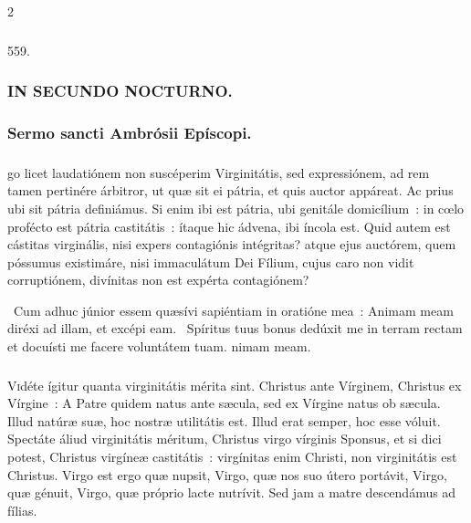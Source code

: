 \documentclass[9pt,twoside]{extarticle}
\begin{document}
\begin{multicols}{2}
{\subsubsection*{\center {}}

\begin{tightlist}{}
\item {} 559. 
\item {}
\end{tightlist}

\subsubsection*{\center \textsc{IN SECUNDO NOCTURNO.}}
\subsubsection*{\center Sermo sancti Ambrósii Epíscopi.}
\subsubsection*{\center {}}
go licet laudatiónem non suscéperim Virginitátis, sed expressiónem, ad rem tamen pertinére árbitror, ut quæ sit ei pátria, et quis auctor appáreat. Ac prius ubi sit pátria definiámus. Si enim ibi est pátria, ubi genitále domicílium~: in cœlo profécto est pátria castitátis~: ítaque hic ádvena, ibi íncola est. Quid autem est cástitas virginális, nisi expers contagiónis intégritas? atque ejus auctórem, quem póssumus existimáre, nisi immaculátum Dei Fílium, cujus caro non vidit corruptiónem, divínitas non est expérta contagiónem?

\begin{tightlist}{}
\item {}~Cum adhuc júnior essem quæsívi sapiéntiam in oratióne mea~: \textred{*} Animam meam diréxi ad illam, et excépi eam. ~Spíritus tuus bonus dedúxit me in terram rectam et docuísti me facere voluntátem tuam. nimam meam.
\end{tightlist}

\subsubsection*{\center {}}
\lettrine{V}idéte ígitur quanta virginitátis mérita sint. Christus ante Vírginem, Christus ex Vírgine~: A Patre quidem natus ante sæcula, sed ex Vírgine natus ob sæcula. Illud natúræ suæ, hoc nostræ utilitátis est. Illud erat semper, hoc esse vóluit. Spectáte áliud virginitátis méritum, Christus virgo vírginis Sponsus, et si dici potest, Christus virgíneæ castitátis~: virgínitas enim Christi, non virginitátis est Christus. Virgo est ergo quæ nupsit, Virgo, quæ nos suo útero portávit, Virgo, quæ génuit, Virgo, quæ próprio lacte nutrívit. Sed jam a matre descendámus ad fílias.

}
\end{multicols}
\end{document}
